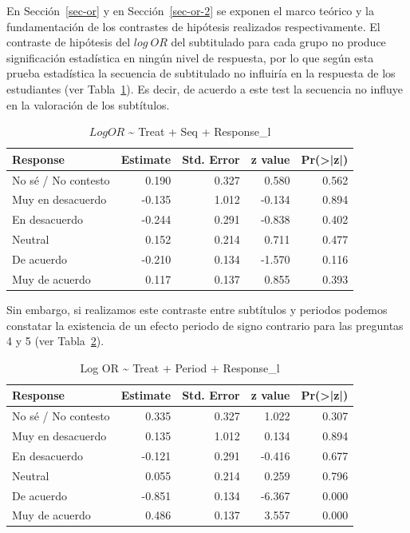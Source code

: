 \documentclass[
  12pt,
  a4paper,
  extrafontsizes,
  onecolumn,
  openright,
  table]{memoir}
\begin{document}
En Sección~\ref{sec-or} y en Sección~\ref{sec-or-2} se exponen el marco
teórico y la fundamentación de los contrastes de hipótesis realizados
respectivamente. El contraste de hipótesis del \(log\ OR\) del
subtitulado para cada grupo no produce significación estadística en
ningún nivel de respuesta, por lo que según esta prueba estadística la
secuencia de subtitulado no influiría en la respuesta de los estudiantes
(ver Tabla~\ref{tbl-logor1}). Es decir, de acuerdo a este test la
secuencia no influye en la valoración de los subtítulos.

\hypertarget{tbl-logor1}{}
\begin{longtable}{lrrrr}
\caption{\label{tbl-logor1}\(Log OR\) \textasciitilde{} Treat + Seq + Response\_l }\tabularnewline

\toprule
Response & Estimate & Std. Error & z value & Pr(>|z|) \\ 
\midrule
No sé / No contesto & 0.190 & 0.327 & 0.580 & 0.562 \\ 
Muy en desacuerdo & -0.135 & 1.012 & -0.134 & 0.894 \\ 
En desacuerdo & -0.244 & 0.291 & -0.838 & 0.402 \\ 
Neutral & 0.152 & 0.214 & 0.711 & 0.477 \\ 
De acuerdo & -0.210 & 0.134 & -1.570 & 0.116 \\ 
Muy de acuerdo & 0.117 & 0.137 & 0.855 & 0.393 \\ 
\bottomrule
\end{longtable}

Sin embargo, si realizamos este contraste entre subtítulos y periodos
podemos constatar la existencia de un efecto periodo de signo contrario
para las preguntas 4 y 5 (ver Tabla~\ref{tbl-logor2}).

\hypertarget{tbl-logor2}{}
\begin{longtable}{lrrrr}
\caption{\label{tbl-logor2}Log OR \textasciitilde{} Treat + Period + Response\_l }\tabularnewline

\toprule
Response & Estimate & Std. Error & z value & Pr(>|z|) \\ 
\midrule
No sé / No contesto & 0.335 & 0.327 & 1.022 & 0.307 \\ 
Muy en desacuerdo & 0.135 & 1.012 & 0.134 & 0.894 \\ 
En desacuerdo & -0.121 & 0.291 & -0.416 & 0.677 \\ 
Neutral & 0.055 & 0.214 & 0.259 & 0.796 \\ 
De acuerdo & -0.851 & 0.134 & -6.367 & 0.000 \\ 
Muy de acuerdo & 0.486 & 0.137 & 3.557 & 0.000 \\ 
\bottomrule
\end{longtable}
\end{document}
